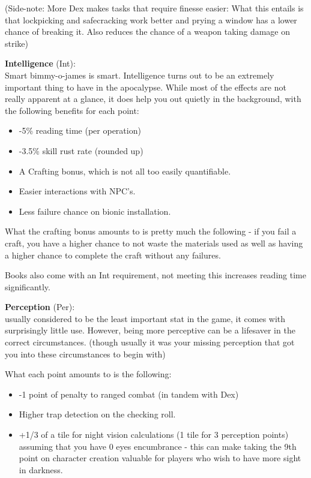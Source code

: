 (Side-note: More Dex makes tasks that require finesse easier: What this entails is that lockpicking and safecracking work better and prying a window has a lower chance of breaking it. Also reduces the chance of a weapon taking damage on strike)

\textbf{Intelligence} (Int):\\Smart bimmy-o-james is smart. Intelligence turns out to be an extremely important thing to have in the apocalypse. While most of the effects are not really apparent at a glance, it does help you out quietly in the background, with the following benefits for each point:
\begin{itemize}
\item -5\% reading time (per operation)
\item -3.5\% skill rust rate (rounded up)
\item A Crafting bonus, which is not all too easily quantifiable.
\item Easier interactions with NPC's.
\item Less failure chance on bionic installation.
\end{itemize}

What the crafting bonus amounts to is pretty much the following - if you fail a craft, you have a higher chance to not waste the materials used as well as having a higher chance to complete the craft without any failures.

Books also come with an Int requirement, not meeting this increases reading time significantly.

\textbf{Perception} (Per):\\usually considered to be the least important stat in the game, it comes with surprisingly little use. However, being more perceptive can be a lifesaver in the correct circumstances. (though usually it was your missing perception that got you into these circumstances to begin with)

What each point amounts to is the following:
\begin{itemize}
\item -1 point of penalty to ranged combat (in tandem with Dex)
\item Higher trap detection on the checking roll.
\item +1/3 of a tile for night vision calculations (1 tile for 3 perception points) assuming that you have 0 eyes encumbrance - this can make taking the 9th point on character creation valuable for players who wish to have more sight in darkness.
\end{itemize}

